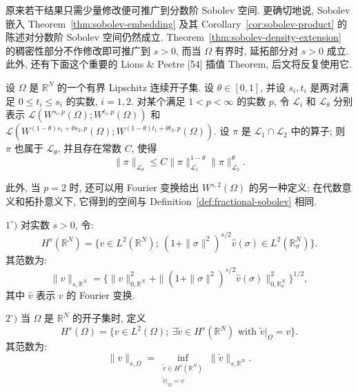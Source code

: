 原来若干结果只需少量修改便可推广到分数阶 Sobolev 空间. 更确切地说, Sobolev 嵌入
Theorem~\ref{thm:sobolev-embedding} 及其 Corollary~\ref{cor:sobolev-product} 的陈述对分数阶 Sobolev 空间仍然成立.
Theorem~\ref{thm:sobolev-density-extension} 的稠密性部分不作修改即可推广到 $s>0$, 而当 $\Omega$ 有界时,
延拓部分对 $s>0$ 成立. 此外, 还有下面这个重要的 Lions \& Peetre [54] 插值 Theorem, 后文将反复使用它.

\setcounter{statement}{3}
\renewcommand{\theHstatement}{theorem.\thesection.\arabic{statement}}
\begin{Theorem}\label{thm:lions-peetre-interpolation}
设 $\Omega$ 是 $\mathbb R^N$ 的一个有界 Lipschitz 连续开子集. 设 $\theta\in[0,1]$, 并设
$s_i,t_i$ 是两对满足 $0\leq t_i\leq s_i$ 的实数, $i=1,2$. 对某个满足 $1<p<\infty$ 的实数 $p$,
令 $\mathcal L_i$ 和 $\mathcal L_\theta$ 分别表示
$\mathcal L(W^{s_i,p}(\Omega);W^{t_i,p}(\Omega))$ 和
$\mathcal L(W^{(1-\theta)s_1+\theta s_2,p}(\Omega);W^{(1-\theta)t_1+\theta t_2,p}(\Omega))$.
设 $\pi$ 是 $\mathcal L_1\cap\mathcal L_2$ 中的算子; 则 $\pi$ 也属于 $\mathcal L_\theta$, 并且存在常数 $C$, 使得
\begin{equation}\label{eq:lions-peetre-interpolation-bound}
\|\pi\|_{\mathcal L_\theta}
\leq C\|\pi\|_{\mathcal L_1}^{1-\theta}
\|\pi\|_{\mathcal L_2}^{\theta}.
\end{equation}
\end{Theorem}

此外, 当 $p=2$ 时, 还可以用 Fourier 变换给出 $W^{s,2}(\Omega)$ 的另一种定义; 在代数意义和拓扑意义下,
它得到的空间与 Definition~\ref{def:fractional-sobolev} 相同.

\setcounter{statement}{2}
\renewcommand{\theHstatement}{definition.\thesection.\arabic{statement}}
\begin{Definition}\label{def:fourier-hs-spaces}
$1^\circ)$ 对实数 $s>0$, 令:
\begin{equation}\label{eq:fourier-hs-rn}
H^s(\mathbb R^N)=\{v\in L^2(\mathbb R^N);\ (1+\|\sigma\|^2)^{s/2}\hat v(\sigma)
\in L^2(\mathbb R_\sigma^N)\}.
\end{equation}
其范数为:
\begin{equation}\label{eq:fourier-hs-rn-norm}
\|v\|_{s,\mathbb R^N}=\{\|v\|_{0,\mathbb R^N}^2+
\|(1+\|\sigma\|^2)^{s/2}\hat v(\sigma)\|_{0,\mathbb R_\sigma^N}^2\}^{1/2},
\end{equation}
其中 $\hat v$ 表示 $v$ 的 Fourier 变换.

$2^\circ)$ 当 $\Omega$ 是 $\mathbb R^N$ 的开子集时, 定义
\begin{equation}\label{eq:fourier-hs-domain}
H^s(\Omega)=\{v\in L^2(\Omega);\ \exists\tilde v\in H^s(\mathbb R^N)
\text{ with }\tilde v|_\Omega=v\}.
\end{equation}
其范数为:
\begin{equation}\label{eq:fourier-hs-domain-norm}
\|v\|_{s,\Omega}=
\inf_{\substack{\tilde v\in H^s(\mathbb R^N)\\\tilde v|_\Omega=v}}
\|\tilde v\|_{s,\mathbb R^N}.
\end{equation}
\end{Definition}

